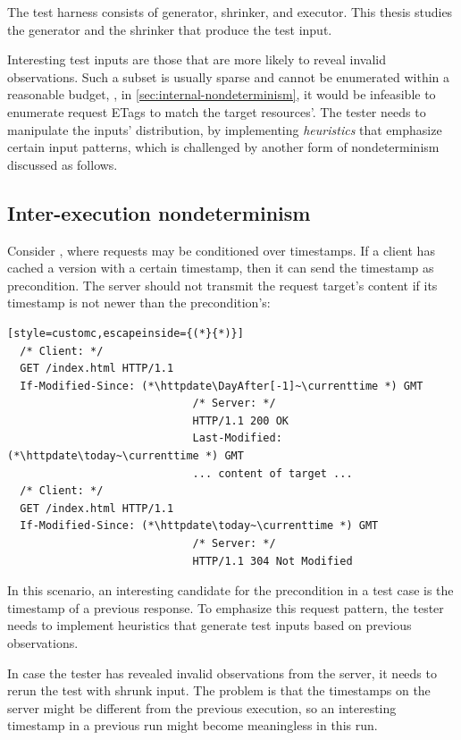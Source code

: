 The test harness consists of generator, shrinker, and executor.  This thesis
studies the generator and the shrinker that produce the test input.

Interesting test inputs are those that are more likely to reveal invalid
observations.  Such a subset is usually sparse and cannot be enumerated within a
reasonable budget, \eg, in \autoref{sec:internal-nondeterminism}, it would be
infeasible to enumerate request ETags to match the target resources'.  The
tester needs to manipulate the inputs' distribution, by implementing {\em
heuristics} that emphasize certain input patterns, which is challenged by
another form of nondeterminism discussed as follows.

\subsection{Inter-execution nondeterminism}
\label{sec:inter-execution}
Consider \http, where requests may be conditioned over timestamps.  If a client
has cached a version with a certain timestamp, then it can send the timestamp as
 precondition.  The server should not transmit the
request target's content if its  timestamp is not newer
than the precondition's:
\begin{lstlisting}[style=customc,escapeinside={(*}{*)}]
  /* Client: */
  GET /index.html HTTP/1.1
  If-Modified-Since: (*\httpdate\DayAfter[-1]~\currenttime *) GMT
                             /* Server: */
                             HTTP/1.1 200 OK
                             Last-Modified: (*\httpdate\today~\currenttime *) GMT
                             ... content of target ...
  /* Client: */
  GET /index.html HTTP/1.1
  If-Modified-Since: (*\httpdate\today~\currenttime *) GMT
                             /* Server: */
                             HTTP/1.1 304 Not Modified
\end{lstlisting}

In this scenario, an interesting candidate for the 
precondition in a test case is the  timestamp of a
previous response.  To emphasize this request pattern, the tester needs to
implement heuristics that generate test inputs based on previous observations.

In case the tester has revealed invalid observations from the server, it needs
to rerun the test with shrunk input.  The problem is that the timestamps on the
server might be different from the previous execution, so an interesting
timestamp in a previous run might become meaningless in this run.

